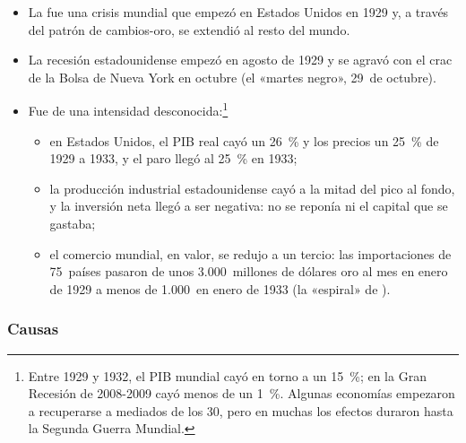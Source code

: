 \documentclass[11pt]{article}
\begin{document}
\begin{itemize}
\item La  fue una crisis mundial que empezó en Estados Unidos en 1929 y, a través del patrón de cambios-oro, se extendió al resto del mundo.
\item La recesión estadounidense empezó en agosto de 1929 y se agravó con el crac de la Bolsa de Nueva York en octubre (el «martes negro», 29~de octubre).
\item Fue de una intensidad desconocida:\footnote{Entre 1929 y 1932, el PIB mundial cayó en torno a un 15~\%; en la Gran Recesión de 2008-2009 cayó menos de un 1~\%. Algunas economías empezaron a recuperarse a mediados de los 30, pero en muchas los efectos duraron hasta la Segunda Guerra Mundial.}
  \begin{itemize}
  \item en Estados Unidos, el PIB real cayó un 26~\% y los precios un 25~\% de 1929 a 1933, y el paro llegó al 25~\% en 1933\nocite{FriedmanSchwartz1963Monetary};
  \item la producción industrial estadounidense cayó a la mitad del pico al fondo, y la inversión neta llegó a ser negativa: no se reponía ni el capital que se gastaba;
  \item el comercio mundial, en valor, se redujo a un tercio: las importaciones de 75~países pasaron de unos 3.000~millones de dólares oro al mes en enero de 1929 a menos de 1.000~en enero de 1933 (la «espiral» de )\nocite{Kindleberger1973World}.
  \end{itemize}
\end{itemize}

\subsubsection{Causas}
\end{document}
